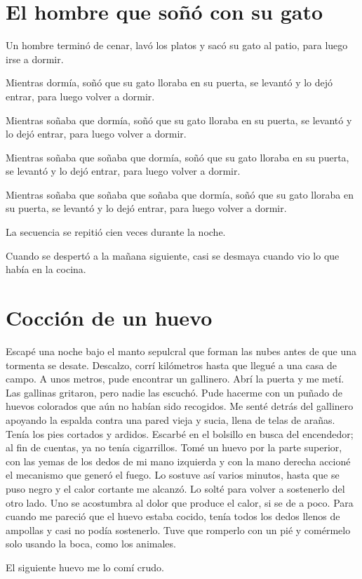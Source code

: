 \documentclass[11pt,twoside,openright,a6paper]{book}
\begin{document}
\chapter*{El hombre que soñó con su gato}

Un hombre terminó de cenar, lavó los platos y sacó su gato al patio, para luego irse a dormir.

Mientras dormía, soñó que su gato lloraba en su puerta, se levantó y lo dejó entrar, para luego volver a dormir.

Mientras soñaba que dormía, soñó que su gato lloraba en su puerta, se levantó y lo dejó entrar, para luego volver a dormir.

Mientras soñaba que soñaba que dormía, soñó que su gato lloraba en su puerta, se levantó y lo dejó entrar, para luego volver a dormir.

Mientras soñaba que soñaba que soñaba que dormía, soñó que su gato lloraba en su puerta, se levantó y lo dejó entrar, para luego volver a dormir.

La secuencia se repitió cien veces durante la noche.

Cuando se despertó a la mañana siguiente, casi se desmaya cuando vio lo que había en la cocina.

\chapter*{Cocción de un huevo}

Escapé una noche bajo el manto sepulcral que forman las nubes antes de que una tormenta se desate. Descalzo, corrí kilómetros hasta que llegué a una casa de campo. A unos metros, pude encontrar un gallinero. Abrí la puerta y me metí. Las gallinas gritaron, pero nadie las escuchó. Pude hacerme con un puñado de huevos colorados que aún no habían sido recogidos. Me senté detrás del gallinero apoyando la espalda contra una pared vieja y sucia, llena de telas de arañas. Tenía los pies cortados y ardidos. Escarbé en el bolsillo en busca del encendedor; al fin de cuentas, ya no tenía cigarrillos. Tomé un huevo por la parte superior, con las yemas de los dedos de mi mano izquierda y con la mano derecha accioné el mecanismo que generó el fuego. Lo sostuve así varios minutos, hasta que se puso negro y el calor cortante me alcanzó. Lo solté para volver a sostenerlo del otro lado. Uno se acostumbra al dolor que produce el calor, si se de a poco. Para cuando me pareció que el huevo estaba cocido, tenía todos los dedos llenos de ampollas y casi no podía sostenerlo. Tuve que romperlo con un pié y comérmelo solo usando la boca, como los animales.

El siguiente huevo me lo comí crudo.
\end{document}
